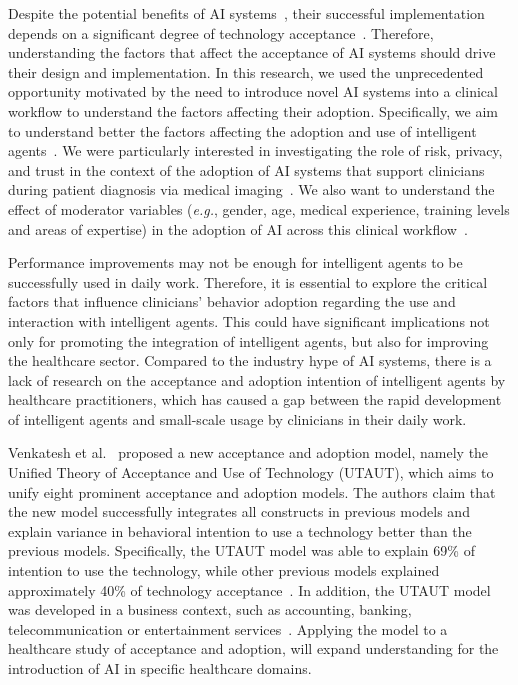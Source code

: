 Despite the potential benefits of AI systems~\cite{10.1145/3290605.3300233}, their successful implementation depends on a significant degree of technology acceptance~\cite{calisto2019midaaiarfuv, https://doi.org/10.13140/rg.2.2.25412.68486}.
Therefore, understanding the factors that affect the acceptance of AI systems should drive their design and implementation.
In this research, we used the unprecedented opportunity motivated by the need to introduce novel AI systems into a clinical workflow to understand the factors affecting their adoption.
Specifically, we aim to understand better the factors affecting the adoption and use of intelligent agents~\cite{JUNGMANN2021834, doi:10.1200/CCI.20.00148, info:doi/10.2196/12422}.
We were particularly interested in investigating the role of risk, privacy, and trust in the context of the adoption of AI systems that support clinicians during patient diagnosis via medical imaging~\cite{CALISTO2021102607, Kocielnik:2019:YAI:3290605.3300641}.
We also want to understand the effect of moderator variables ({\it e.g.}, gender, age, medical experience, training levels and areas of expertise) in the adoption of AI across this clinical workflow~\cite{Fan2020}.

Performance improvements may not be enough for intelligent agents to be successfully used in daily work.
Therefore, it is essential to explore the critical factors that influence clinicians’ behavior adoption regarding the use and interaction with intelligent agents.
This could have significant implications not only for promoting the integration of intelligent agents, but also for improving the healthcare sector.
Compared to the industry hype of AI systems, there is a lack of research on the acceptance and adoption intention of intelligent agents by healthcare practitioners, which has caused a gap between the rapid development of intelligent agents and small-scale usage by clinicians in their daily work.

Venkatesh et al.~\cite{venkatesh2016unified} proposed a new acceptance and adoption model, namely the Unified Theory of Acceptance and Use of Technology (UTAUT), which aims to unify eight prominent acceptance and adoption models.
The authors claim that the new model successfully integrates all constructs in previous models and explain variance in behavioral intention to use a technology better than the previous models.
Specifically, the UTAUT model was able to explain 69\% of intention to use the technology, while other previous models explained approximately 40\% of technology acceptance~\cite{10.2307/30036540}.
In addition, the UTAUT model was developed in a business context, such as accounting, banking, telecommunication or entertainment services~\cite{KIJSANAYOTIN2009404}.
Applying the model to a healthcare study of acceptance and adoption, will expand understanding for the introduction of AI in specific healthcare domains.

